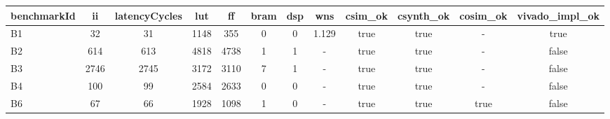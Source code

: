 \begin{tabular}{|l|c|c|c|c|c|c|c|c|c|c|c|}
\hline
benchmarkId & ii & latencyCycles & lut & ff & bram & dsp & wns & csim\_ok & csynth\_ok & cosim\_ok & vivado\_impl\_ok \\
\hline
B1 & 32 & 31 & 1148 & 355 & 0 & 0 & 1.129 & true & true & - & true \\
B2 & 614 & 613 & 4818 & 4738 & 1 & 1 & - & true & true & - & false \\
B3 & 2746 & 2745 & 3172 & 3110 & 7 & 1 & - & true & true & - & false \\
B4 & 100 & 99 & 2584 & 2633 & 0 & 0 & - & true & true & - & false \\
B6 & 67 & 66 & 1928 & 1098 & 1 & 0 & - & true & true & true & false \\
\hline
\end{tabular}
